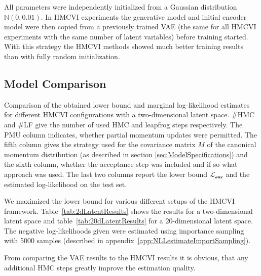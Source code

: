 \documentclass[12pt]{scrartcl}
\begin{document}
All parameters were independently initialized from a Gaussian distribution $\mathbb{N}(0, 0.01)$. In HMCVI experiments the generative model and initial encoder model were then copied from a previously trained VAE (the same for all HMCVI experiments with the same number of latent variables) before training started. With this strategy the HMCVI methods showed much better training results than with fully random initialization.

\subsection{Model Comparison}

\begin{table*}
\centering

\caption{Comparison of the obtained lower bound and marginal log-likelihood estimates for different HMCVI configurations with a two-dimensional latent space. \#HMC and \#LF give the number of used HMC and leapfrog steps respectively. The PMU column indicates, whether partial momentum updates were permitted. The fifth column gives the strategy used for the covariance matrix $M$ of the canonical momentum distribution (as described in section \ref{sec:ModelSpecifications}) and the sixth column, whether the acceptance step was included and if so what approach was used. The last two columns report the lower bound $\mathcal{L_\textrm{aux}}$ and the estimated log-likelihood on the test set.}
\label{tab:2dLatentResults}
\end{table*}

We maximized the lower bound for various different setups of the HMCVI framework. Table~\ref{tab:2dLatentResults} shows the results for a two-dimensional latent space and table~\ref{tab:20dLatentResults} for a 20-dimensional latent space. The negative log-likelihoods given were estimated using importance sampling with 5000 samples (described in appendix~\ref{app:NLLestimateImportSampling}).

From comparing the VAE results to the HMCVI results it is obvious, that any additional HMC steps greatly improve the estimation quality. 
\end{document}
